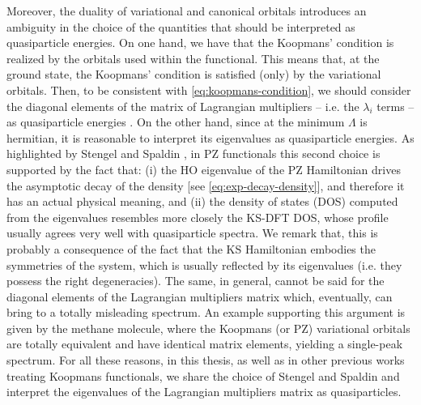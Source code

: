 Moreover, the duality of variational and canonical orbitals introduces an ambiguity in the choice of the quantities that should be interpreted as quasiparticle energies. On one hand, we have that the Koopmans' condition is realized by the orbitals used within the functional. This means that, at the ground state, the Koopmans' condition is satisfied (only) by the variational orbitals. Then, to be consistent with \cref{eq:koopmans-condition}, we should consider the diagonal elements of the matrix of Lagrangian multipliers -- i.e. the $\lambda_i$ terms -- as quasiparticle energies \cite{vydrov_tests_2007}. On the other hand, since at the minimum $\Lambda$ is hermitian, it is reasonable to interpret its eigenvalues as quasiparticle energies. As highlighted by Stengel and Spaldin \cite{stengel_self-interaction_2008}, in PZ functionals this second choice is supported by the fact that: (i) the HO eigenvalue of the PZ Hamiltonian drives the asymptotic decay of the density [see \cref{eq:exp-decay-density}], and therefore it has an actual physical meaning, and (ii) the density of states (DOS) computed from the eigenvalues resembles more closely the KS-DFT DOS, whose profile usually agrees very well with quasiparticle spectra. We remark that, this is probably a consequence of the fact that the KS Hamiltonian embodies the symmetries of the system, which is usually reflected by its eigenvalues (i.e. they possess the right degeneracies). The same, in general, cannot be said for the diagonal elements of the Lagrangian multipliers matrix which, eventually, can bring to a totally misleading spectrum. An example supporting this argument is given by the methane molecule, where the Koopmans (or PZ) variational orbitals are totally equivalent and have identical matrix elements, yielding a single-peak spectrum. For all these reasons, in this thesis, as well as in other previous works treating Koopmans functionals, we share the choice of Stengel and Spaldin and interpret the eigenvalues of the Lagrangian multipliers matrix as quasiparticles.

